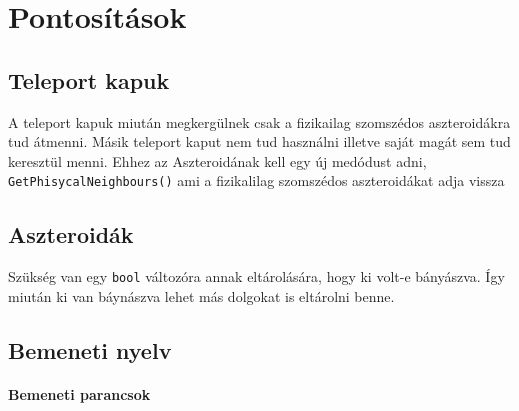 \documentclass[../../projlab]{subfiles}
\begin{document}
\makeatletter


\makeatother

\chapter{Pontosítások}

\section{Teleport kapuk}
A teleport kapuk miután megkergülnek csak a fizikailag szomszédos aszteroidákra tud átmenni.
Másik teleport kaput nem tud használni illetve saját magát sem tud keresztül menni.
Ehhez az Aszteroidának kell egy új medódust adni, \verb"GetPhisycalNeighbours()" ami a fizikalilag szomszédos aszteroidákat adja vissza

\section{Aszteroidák}
Szükség van egy \verb"bool" változóra annak eltárolására, hogy ki volt-e bányászva. 
Így miután ki van báynászva lehet más dolgokat is eltárolni benne.



\section{Bemeneti nyelv}

\subsubsection{Bemeneti parancsok}
\end{document}
